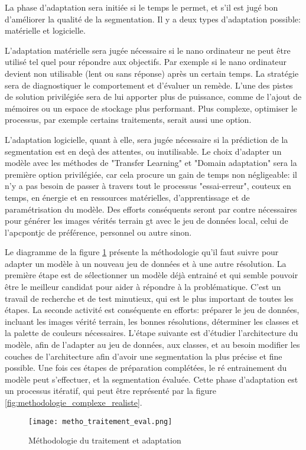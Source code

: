 ﻿\par La phase d'adaptation sera initiée si le temps le permet, et s'il est jugé bon d'améliorer la qualité de la segmentation. Il y a deux types d'adaptation possible: matérielle et logicielle.
\par L'adaptation matérielle sera jugée nécessaire si le nano ordinateur ne peut être utilisé tel quel pour répondre aux objectifs. Par exemple si le nano ordinateur devient non utilisable (lent ou sans réponse) après un certain temps. La stratégie sera de diagnostiquer le comportement et d'évaluer un remède. L'une des pistes de solution privilégiée sera de lui apporter plus de puissance, comme de l'ajout de mémoires ou un espace de stockage plus performant. Plus complexe, optimiser le processus, par exemple certains traitements, serait aussi une option.
\par L'adaptation logicielle, quant à elle, sera jugée nécessaire si la prédiction de la segmentation est en deçà des attentes, ou inutilisable. Le choix d'adapter un modèle avec les méthodes de "Transfer Learning" et "Domain adaptation" sera la première option privilégiée, car cela procure un gain de temps non négligeable: il n'y a pas besoin de passer à travers tout le processus "essai-erreur", couteux en temps, en énergie et en ressources matérielles, d'apprentissage et de paramétrisation du modèle. Des efforts conséquents seront par contre nécessaires pour générer les images vérités terrain \acrshort{gt} avec le jeu de données local, celui de l'\acrshort{apcpontjc} de préférence, personnel ou autre sinon.
\par Le diagramme de la figure \ref{fig:metho_adaptation} présente la méthodologie qu'il faut suivre pour adapter un modèle à un nouveau jeu de données et à une autre résolution. La première étape est de sélectionner un modèle déjà entrainé et qui semble pouvoir être le meilleur candidat pour aider à répondre à la problématique. C'est un travail de recherche et de test minutieux, qui est le plus important de toutes les étapes. La seconde activité est conséquente en efforts: préparer le jeu de données, incluant les images vérité terrain, les bonnes résolutions, déterminer les classes et la palette de couleurs nécessaires. L'étape suivante est d'étudier l'architecture du modèle, afin de l'adapter au jeu de données, aux classes, et au besoin modifier les couches de l'architecture afin d'avoir une segmentation la plus précise et fine possible. Une fois ces étapes de préparation complétées, le ré entrainement du modèle peut s'effectuer, et la segmentation évaluée. Cette phase d'adaptation est un processus itératif, qui peut être représenté par la figure \ref{fig:methodologie_complexe_realiste}.
\label{metho_adaptation}
\begin{figure}[H]
    \centering
    \texttt{[image: metho\_traitement\_eval.png]}
    \caption{Méthodologie du traitement et adaptation}
    \label{fig:metho_adaptation}
\end{figure}